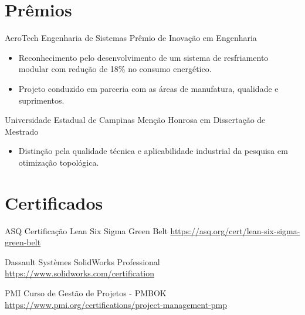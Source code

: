 \documentclass[a4paper, serif, 10pt]{moderncv}
\begin{document}
\section{Prêmios}

        {AeroTech Engenharia de Sistemas}
        {Prêmio de Inovação em Engenharia}
        {}
        {}
        {\begin{itemize}
\item Reconhecimento pelo desenvolvimento de um sistema de resfriamento modular com redução de 18\% no consumo energético.
\item Projeto conduzido em parceria com as áreas de manufatura, qualidade e suprimentos.
\end{itemize}}

        {Universidade Estadual de Campinas}
        {Menção Honrosa em Dissertação de Mestrado}
        {}
        {}
        {\begin{itemize}
\item Distinção pela qualidade técnica e aplicabilidade industrial da pesquisa em otimização topológica.
\end{itemize}}
\section{Certificados}

        {ASQ}
        {Certificação Lean Six Sigma Green Belt}
        {\url{https://asq.org/cert/lean-six-sigma-green-belt}}
        {}
        {}

        {Dassault Systèmes}
        {SolidWorks Professional}
        {\url{https://www.solidworks.com/certification}}
        {}
        {}

        {PMI}
        {Curso de Gestão de Projetos - PMBOK}
        {\url{https://www.pmi.org/certifications/project-management-pmp}}
        {}
        {}
\end{document}
